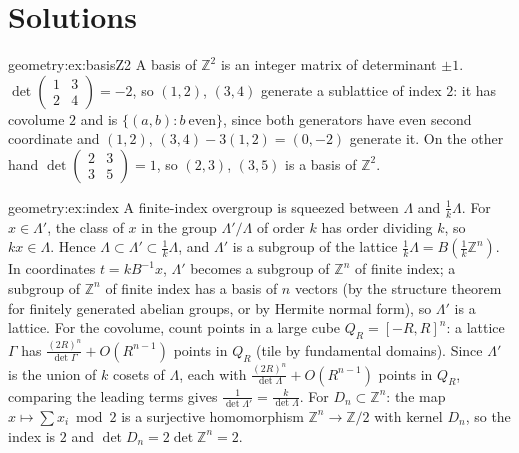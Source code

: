 \section{Solutions}

\begin{solution}{geometry:ex:basisZ2}
\idea A basis of $\mathbb Z^2$ is an integer matrix of determinant $\pm1$.
\writeup $\det\begin{pmatrix}1&3\\2&4\end{pmatrix}=-2$, so $(1,2)$, $(3,4)$ generate a sublattice of index $2$: it has covolume $2$ and is
$\{(a,b):b\ \text{even}\}$, since both generators have even second coordinate and $(1,2)$, $(3,4)-3(1,2)=(0,-2)$ generate it. On the other hand
$\det\begin{pmatrix}2&3\\3&5\end{pmatrix}=1$, so $(2,3)$, $(3,5)$ is a basis of $\mathbb Z^2$.
\end{solution}

\begin{solution}{geometry:ex:index}
\idea A finite-index overgroup is squeezed between $\Lambda$ and $\frac1k\Lambda$.
\writeup For $x\in\Lambda'$, the class of $x$ in the group $\Lambda'/\Lambda$ of order $k$ has order dividing $k$, so $kx\in\Lambda$. Hence
$\Lambda\subset\Lambda'\subset\frac1k\Lambda$, and $\Lambda'$ is a subgroup of the lattice $\frac1k\Lambda=B(\frac1k\mathbb Z^n)$. In coordinates
$t=kB^{-1}x$, $\Lambda'$ becomes a subgroup of $\mathbb Z^n$ of finite index; a subgroup of $\mathbb Z^n$ of finite index has a basis of $n$ vectors (by the
structure theorem for finitely generated abelian groups, or by Hermite normal form), so $\Lambda'$ is a lattice. For the covolume, count points in a large
cube $Q_R=[-R,R]^n$: a lattice $\Gamma$ has $\frac{(2R)^n}{\det\Gamma}+O(R^{n-1})$ points in $Q_R$ (tile by fundamental domains). Since $\Lambda'$ is the union of
$k$ cosets of $\Lambda$, each with $\frac{(2R)^n}{\det\Lambda}+O(R^{n-1})$ points in $Q_R$, comparing the leading terms gives $\frac1{\det\Lambda'}=\frac
k{\det\Lambda}$. For $D_n\subset\mathbb Z^n$: the map $x\mapsto\sum x_i\bmod2$ is a surjective homomorphism $\mathbb Z^n\to\mathbb Z/2$ with kernel $D_n$, so the
index is $2$ and $\det D_n=2\det\mathbb Z^n=2$.
\end{solution}

